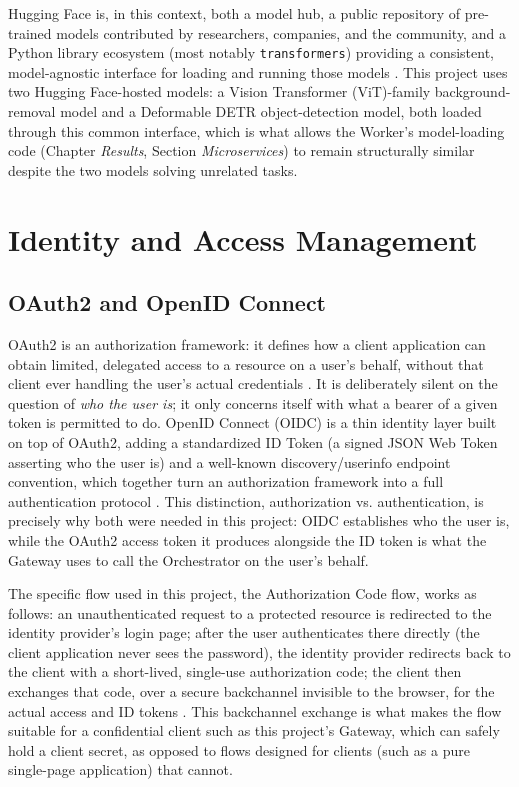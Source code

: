 \documentclass[twoside]{supsistudent}
\begin{document}
Hugging Face is, in this context, both a model hub, a public repository of pre-trained models contributed by researchers, companies, and the community, and a Python library ecosystem (most notably \texttt{transformers}) providing a consistent, model-agnostic interface for loading and running those models \cite{wolf2020transformers}. This project uses two Hugging Face-hosted models: a Vision Transformer (ViT)-family background-removal model and a Deformable DETR object-detection model, both loaded through this common interface, which is what allows the Worker's model-loading code (Chapter \emph{Results}, Section \emph{Microservices}) to remain structurally similar despite the two models solving unrelated tasks.

\section{Identity and Access Management}

\subsection{OAuth2 and OpenID Connect}
OAuth2 is an authorization framework: it defines how a client application can obtain limited, delegated access to a resource on a user's behalf, without that client ever handling the user's actual credentials \cite{rfc6749}. It is deliberately silent on the question of \emph{who the user is}; it only concerns itself with what a bearer of a given token is permitted to do. OpenID Connect (OIDC) is a thin identity layer built on top of OAuth2, adding a standardized ID Token (a signed JSON Web Token asserting who the user is) and a well-known discovery/userinfo endpoint convention, which together turn an authorization framework into a full authentication protocol \cite{oidccore}. This distinction, authorization vs. authentication, is precisely why both were needed in this project: OIDC establishes who the user is, while the OAuth2 access token it produces alongside the ID token is what the Gateway uses to call the Orchestrator on the user's behalf.

The specific flow used in this project, the Authorization Code flow, works as follows: an unauthenticated request to a protected resource is redirected to the identity provider's login page; after the user authenticates there directly (the client application never sees the password), the identity provider redirects back to the client with a short-lived, single-use authorization code; the client then exchanges that code, over a secure backchannel invisible to the browser, for the actual access and ID tokens \cite{rfc9700, rfc7636, rfc8693}. This backchannel exchange is what makes the flow suitable for a confidential client such as this project's Gateway, which can safely hold a client secret, as opposed to flows designed for clients (such as a pure single-page application) that cannot.
\end{document}

